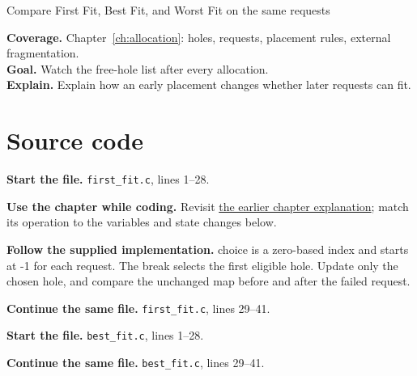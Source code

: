 \begin{labproject}{Compare First Fit, Best Fit, and Worst Fit on the same requests}

\textbf{Coverage.} Chapter~\ref{ch:allocation}: holes, requests, placement rules, external fragmentation.\\
\textbf{Goal.} Watch the free-hole list after every allocation.\\
\textbf{Explain.} Explain how an early placement changes whether later requests can fit.




\section*{Source code}
\noindent\textbf{Start the file.} \texttt{first\_fit.c}, lines 1--28.



\textbf{Use the chapter while coding.} Revisit \hyperref[ch:allocation]{the earlier chapter explanation}; match its operation to the variables and state changes below.

\textbf{Follow the supplied implementation.} choice is a zero-based index and starts at -1 for each request. The break selects the first eligible hole. Update only the chosen hole, and compare the unchanged map before and after the failed request.




\noindent\textbf{Continue the same file.} \texttt{first\_fit.c}, lines 29--41.


\noindent\textbf{Start the file.} \texttt{best\_fit.c}, lines 1--28.


\noindent\textbf{Continue the same file.} \texttt{best\_fit.c}, lines 29--41.



\end{labproject}

